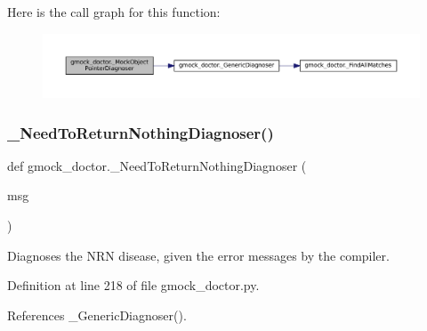 Here is the call graph for this function\+:
\nopagebreak
\begin{figure}[H]
\begin{center}
\leavevmode
\includegraphics[width=350pt]{namespacegmock__doctor_a91e21533e0bc183c40f5a9873158a94b_cgraph}
\end{center}
\end{figure}
\mbox{\label{namespacegmock__doctor_a1d30848b5afc8437c05c03f9d4878a0d}} 
\subsubsection{\texorpdfstring{\+\_\+\+Need\+To\+Return\+Nothing\+Diagnoser()}{\_NeedToReturnNothingDiagnoser()}}
{\footnotesize\ttfamily def gmock\+\_\+doctor.\+\_\+\+Need\+To\+Return\+Nothing\+Diagnoser (\begin{DoxyParamCaption}\item[{}]{msg }\end{DoxyParamCaption})\hspace{0.3cm}{\ttfamily [private]}}

\begin{DoxyVerb}Diagnoses the NRN disease, given the error messages by the compiler.\end{DoxyVerb}
 

Definition at line 218 of file gmock\+\_\+doctor.\+py.



References \+\_\+\+Generic\+Diagnoser().


